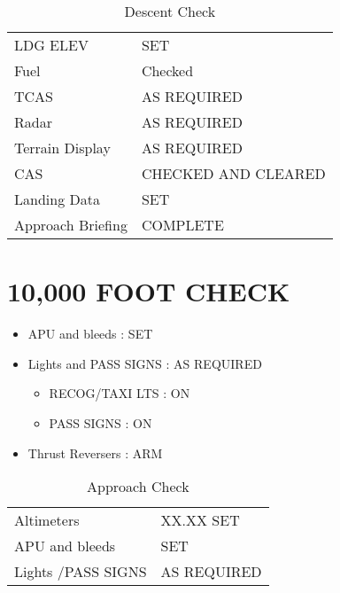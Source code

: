 \begin{table}[htbp]
\begin{minipage}{\linewidth}
\setlength{\tymax}{0.5\linewidth}
\centering
\small
\caption{Descent Check}
\label{descentcheck}
\begin{tabulary}{\textwidth}{@{}ll@{}} \toprule
\midrule

 LDG ELEV   & SET     \\
 Fuel    & Checked    \\
 TCAS    & AS REQUIRED   \\
 Radar    & AS REQUIRED   \\
 Terrain Display & AS REQUIRED   \\
 CAS    & CHECKED AND CLEARED \\
 Landing Data  & SET     \\
 Approach Briefing & COMPLETE   \\
\bottomrule

\end{tabulary}
\end{minipage}
\end{table}

\newpage

\section{10,000 FOOT CHECK}
\label{10000footcheck}

\begin{itemize}
\item APU and bleeds : SET

\item Lights and PASS SIGNS : AS REQUIRED

\begin{itemize}
\item RECOG\slash TAXI LTS : ON

\item PASS SIGNS : ON

\end{itemize}

\item Thrust Reversers : ARM

\end{itemize}

\begin{table}[htbp]
\begin{minipage}{\linewidth}
\setlength{\tymax}{0.5\linewidth}
\centering
\small
\caption{Approach Check}
\label{approachcheck}
\begin{tabulary}{\textwidth}{@{}ll@{}} \toprule
\midrule

 Altimeters   & XX.XX SET \\
 APU and bleeds  & SET   \\
 Lights \slash  PASS SIGNS & AS REQUIRED \\
\bottomrule

\end{tabulary}
\end{minipage}
\end{table}

